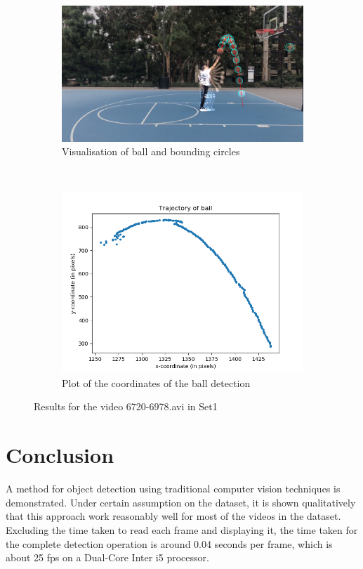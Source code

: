 \documentclass[12pt]{article}
\begin{document}
\begin{figure}[H]
    \centering
    \begin{subfigure}[b]{0.7\textwidth}
         \centering
         \includegraphics[width=\textwidth]{../results/visualisations/output_Set1_6720-6978.png}
         \caption{Visualisation of ball and bounding circles}
     \end{subfigure}\\
     \begin{subfigure}[b]{0.7\textwidth}
         \centering
         \includegraphics[width=\textwidth]{../results/plots/Set1_6720-6978.png}
         \caption{Plot of the coordinates of the ball detection}
     \end{subfigure}
     \caption{Results for the video 6720-6978.avi in Set1}
\end{figure}


\section*{Conclusion}
A method for object detection using traditional computer vision techniques is demonstrated. Under certain assumption on the dataset, it is shown qualitatively that this approach work reasonably well for most of the videos in the dataset. Excluding the time taken to read each frame and displaying it, the time taken for the complete detection operation is around 0.04 seconds per frame, which is about 25 fps on a Dual-Core Inter i5 processor.
\end{document}
